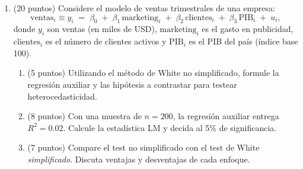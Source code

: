 \documentclass[10pt,a4paper]{article}
\begin{document}
\begin{enumerate}







      \color{black}  
    \item (20 puntos) Considere el modelo de ventas trimestrales de una empresa:
\[
\text{ventas}_i \equiv y_i \;=\; \beta_0 \;+\; \beta_1\,\text{marketing}_i \;+\; \beta_2\,\text{clientes}_i \;+\; \beta_3\,\text{PIB}_i \;+\; u_i,
\]
donde \(y_i\) son ventas (en miles de USD), \(\text{marketing}_i\) es el gasto en publicidad,
\(\text{clientes}_i\) es el número de clientes activos y \(\text{PIB}_i\) es el PIB del país (índice base 100).

\begin{enumerate}
\item (5 puntos) Utilizando el método de White no simplificado, formule la {regresión auxiliar} y las {hipótesis} a contrastar para testear heterocedasticidad.

\item (8 puntos) Con una muestra de \(n=200\), la regresión auxiliar entrega \(R^2 = 0{.}02\).
Calcule la estadística LM y decida al 5\% de significancia.

\item (7 puntos) Compare el test no simplificado con el test de White \emph{simplificado}. Discuta ventajas y desventajas de cada enfoque.
\end{enumerate}






\end{enumerate}
\end{document}
